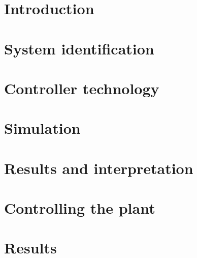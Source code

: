 
\section{Introduction} \label{sec:introduction}


\newpage

\section{System identification} \label{sec:identification}


\newpage

\section{Controller technology} \label{sec:technology}


\newpage

\section{Simulation} \label{sec:simulation}


\newpage

\section{Results and interpretation} \label{sec:results}


\newpage

\section{Controlling the plant} \label{sec:plant}


\newpage

\section{Results} \label{sec:conclusion}

